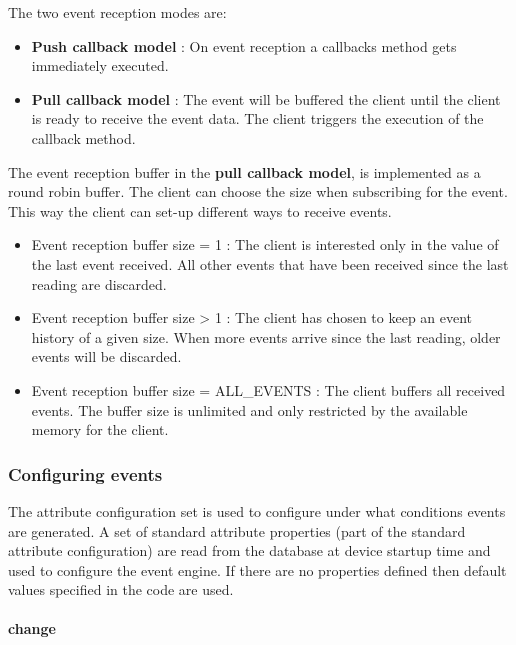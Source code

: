The two event reception modes are:
\begin{itemize}
\item \textbf{Push callback model} : On event reception a callbacks method
gets immediately executed.
\item \textbf{Pull callback model} : The event will be buffered the client
until the client is ready to receive the event data. The client triggers
the execution of the callback method.
\end{itemize}
The event reception buffer in the \textbf{pull callback model}, is
implemented as a round robin buffer. The client can choose the size
when subscribing for the event. This way the client can set-up different
ways to receive events.
\begin{itemize}
\item Event reception buffer size = 1 : The client is interested only in
the value of the last event received. All other events that have been
received since the last reading are discarded.
\item Event reception buffer size > 1 : The client has chosen to keep an
event history of a given size. When more events arrive since the last
reading, older events will be discarded.
\item Event reception buffer size = ALL\_EVENTS : The client buffers all
received events. The buffer size is unlimited and only restricted
by the available memory for the client.
\end{itemize}

\subsubsection{Configuring events}

The attribute configuration set is used to configure under what conditions
events are generated. A set of standard attribute properties
(part of the standard attribute configuration) are read from the database
at device startup time and used to configure the event engine. If
there are no properties defined then default values specified in the
code are used. 

\paragraph{change}

